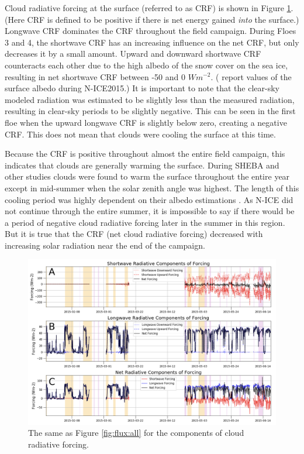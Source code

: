 Cloud radiative forcing at the surface (referred to as CRF) is shown in Figure \ref{fig:crf_timeseries}. (Here CRF is defined to be positive if there is net energy gained \emph{into} the surface.) Longwave CRF dominates the CRF throughout the field campaign. During Floes 3 and 4, the shortwave CRF has an increasing influence on the net CRF, but only decreases it by a small amount. Upward and downward shortwave CRF counteracts each other due to the high albedo of the snow cover on the sea ice, resulting in net shortwave CRF between -50 and 0 $W m^{-2}$. (\citet{walden:2017} report values of the surface albedo during N-ICE2015.) It is important to note that the clear-sky modeled radiation was estimated to be slightly less than the measured radiation, resulting in clear-sky periods to be slightly negative. This can be seen in the first floe when the upward longwave CRF is slightly below zero, creating a negative CRF. This does not mean that clouds were cooling the surface at this time. 

Because the CRF is positive throughout almost the entire field campaign, this indicates that clouds are generally warming the surface. During SHEBA and other studies \citep{schweiger:2004, cogley:1984, walsh:1998, curry:1996} clouds were found to warm the surface throughout the entire year except in mid-summer when the solar zenith angle was highest. The length of this cooling period was highly dependent on their albedo estimations \citep{intrieri:2002}. As N-ICE did not continue through the entire summer, it is impossible to say if there would be a period of negative cloud radiative forcing later in the summer in this region. But it is true that the CRF (net cloud radiative forcing) decreased with increasing solar radiation near the end of the campaign.

\begin{figure}[H]
    \centering
    \includegraphics[width=1\linewidth]{figures/chapter4/ch2_f6.png}
    \caption[Shortwave, longwave, and net components of cloud radiative forcing.]{The same as Figure \ref{fig:flux:all} for the components of cloud radiative forcing.}
    \label{fig:crf_timeseries}
\end{figure}


